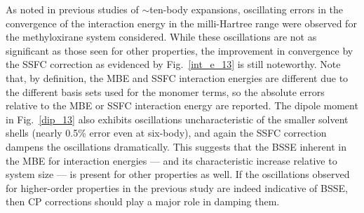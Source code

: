         As noted in previous studies of $\sim$ten-body expansions\cite{Ouyang2014,Richard2018a}, oscillating errors in the convergence of the interaction energy in the milli-Hartree range were observed for the methyloxirane system considered. While these oscillations are not as significant as those seen for other properties, the improvement in convergence by the SSFC correction as evidenced by Fig.\ \ref{int_e_13} is still noteworthy. Note that, by definition, the MBE and SSFC interaction energies are different due to the different basis sets used for the monomer terms, so the absolute errors relative to the MBE or SSFC interaction energy are reported. The dipole moment in Fig.\ \ref{dip_13} also exhibits oscillations uncharacteristic of the smaller solvent shells (nearly 0.5\% error even at six-body), and again the SSFC correction dampens the oscillations dramatically. This suggests that the BSSE inherent in the MBE for interaction energies --- and its characteristic increase relative to system size --- is present for other properties as well. If the oscillations observed for higher-order properties in the previous study are indeed indicative of BSSE, then CP corrections should play a major role in damping them.

